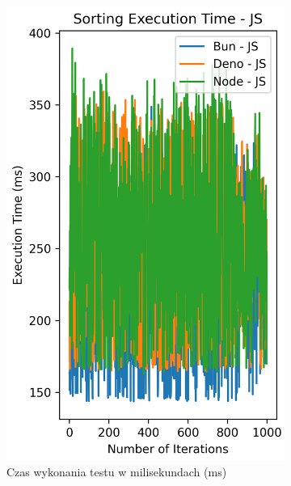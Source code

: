\begin{figure}[H]
  \centering
  \begin{subfigure}[b]{0.4\textwidth}
    \centering
    \includegraphics[width=\textwidth]{Figures/sorting/sorting_bubble_1000_10000_js_time.png}
    \caption{Czas wykonania testu w milisekundach (ms)}
    \label{fig:bubble_sorting_e4_time}
  \end{subfigure}
  \begin{subfigure}[b]{0.4\textwidth}
    \centering

\end{subfigure}
\end{figure}
